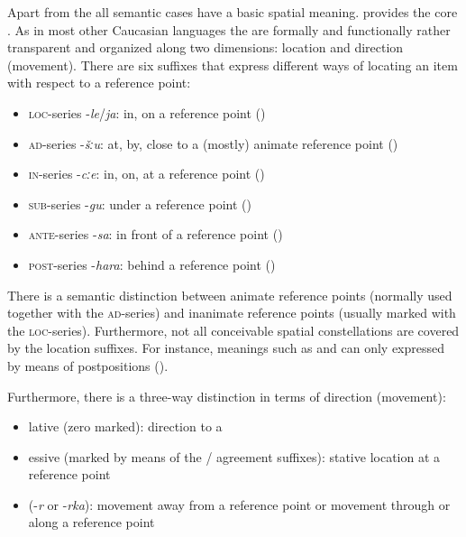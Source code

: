 Apart from the  all semantic cases have a basic spatial meaning.  provides the core . As in most other Caucasian languages the  are formally and functionally rather transparent and organized along two dimensions: location and direction (movement). There are six suffixes that express different ways of locating an item with respect to a reference point: 
%
\begin{itemize}
	\item \textsc{loc}-series -\textit{le}\slash\textit{ja}: in, on a reference point ()
	\item \textsc{ad}-series -\textit{šːu}: at, by, close to a (mostly) animate reference point ()
	\item \textsc{in}-series -\textit{cːe}: in, on, at a reference point ()
	\item \textsc{sub}-series -\textit{gu}: under a reference point ()
	\item \textsc{ante}-series -\textit{sa}: in front of a reference point ()
	\item \textsc{post}-series -\textit{hara}: behind a reference point ()
\end{itemize}


There is a semantic distinction between animate reference points (normally used together with the \textsc{ad}-series) and inanimate reference points (usually marked with the \textsc{loc}-series). Furthermore, not all conceivable spatial constellations are covered by the location suffixes. For instance, meanings such as  and  can only expressed by means of postpositions ().

Furthermore, there is a three-way distinction in terms of direction (movement):
%
\begin{itemize}
	\item lative (zero marked): direction to a 
	\item essive (marked by means of the / agreement suffixes): stative location at a reference point
	\item {} (-\textit{r} or -\textit{rka}): movement away from a reference point or movement through or along a reference point
\end{itemize}


